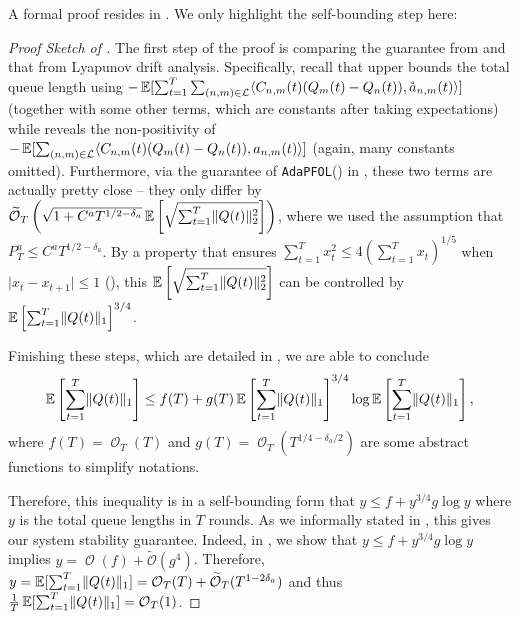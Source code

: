 \documentclass[11pt,fullpage,letterpaper]{article} %
\renewcommand{\bm}[1]{#1}%
\renewcommand{\tilde}{\widetilde}
\renewcommand{\O}{\operatorname{\mathcal O}}
\newcommand{\Otil}{\operatorname{\tilde{\mathcal O}}}
\newcommand{\E}{\operatornamewithlimits{\mathbb{E}}}
\newcommand{\mL}{{\mathcal L}}
\newcommand{\OLOAlg}{\texttt{AdaPFOL}\xspace}
\begin{document}
A formal proof resides in . We only highlight the self-bounding step here:
\begin{proof}[Proof Sketch of ]
The first step of the proof is comparing the guarantee from  and that from Lyapunov drift analysis.
Specifically, recall that  upper bounds the total queue length using $-\E[\sum_{t=1}^{T} \sum_{(n,m)\in \mL} \langle \bm C_{n,m}(t) (\bm Q_m(t) - \bm Q_n(t)),\mathring{\bm a}_{n,m}(t)\rangle]$ (together with some other terms, which are constants after taking expectations) while  reveals the non-positivity of $-\E[\sum_{(n,m)\in \mL} \langle \bm C_{n,m}(t) (\bm Q_m(t) - \bm Q_n(t)),{\bm a}_{n,m}(t)\rangle]$ (again, many constants omitted).
Furthermore, via the guarantee of \OLOAlg () in , these two terms are actually pretty close -- they only differ by $\Otil_T\left (\sqrt{1+C^a T^{1/2-\delta_a}} \E\left [\sqrt{\sum_{t=1}^T \lVert \bm Q(t)\rVert_2^2}\right ]\right )$, where we used the assumption that $P_T^a\le C^a T^{1/2-\delta_a}$.
By a property that ensures $\sum_{t=1}^T x_t^2 \le 4(\sum_{t=1}^T x_t)^{1/5}$ when $\lvert x_t-x_{t+1}\rvert\le 1$ (), this $\E\left [\sqrt{\sum_{t=1}^T \lVert \bm Q(t)\rVert_2^2}\right ]$ can be controlled by $\E\left [\sum_{t=1}^T \lVert \bm Q(t)\rVert_1\right ]^{3/4}$.

Finishing these steps, which are detailed in , we are able to conclude
\begin{equation*}
\E\left [\sum_{t=1}^T \lVert \bm Q(t)\rVert_1\right ]\le f(T) + g(T) \E\left [\sum_{t=1}^T \lVert \bm Q(t)\rVert_1\right ]^{3/4} \log \E\left [\sum_{t=1}^T \lVert \bm Q(t)\rVert_1\right ],
\end{equation*}
where $f(T) = \O_T(T)$ and $g(T) = \O_T(T^{1/4-\delta_a/2})$ are some abstract functions to simplify notations.

Therefore, this inequality is in a self-bounding form that $y\le f+y^{3/4} g \log y$ where $y$ is the total queue lengths in $T$ rounds.
As we informally stated in , this gives our system stability guarantee.
Indeed, in , we show that $y\le f+y^{3/4} g \log y$ implies $y=\O(f)+\Otil(g^4)$. Therefore, $y=\E[\sum_{t=1}^T \lVert \bm Q(t)\rVert_1]=\O_T(T)+\Otil_T(T^{1-2\delta_a})$ and thus $\frac 1T \E[\sum_{t=1}^T \lVert \bm Q(t)\rVert_1]=\O_T(1)$.
\end{proof}
\end{document}
